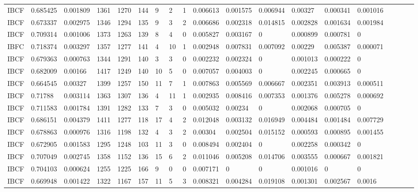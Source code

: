 \begin{table}[H]
{\begin{tabular}{*{19}l}
IBCF 			&	0.685425 &	0.001809 &	1361 &	1270 &	144 &	9 &		2 	&	1 &	0.006613 &	0.001575 &	0.006944 	&	0.00327  &	0.000341 &	0.001016 &	 \\
IBCF 			&	0.673337 &	0.002975 &	1346 &	1294 &	135 &	9 &		3 	&	2 &	0.006686 &	0.002318 &	0.014815 	&	0.002828 &	0.001634 &	0.001984 &	 \\
IBCF 			&	0.709314 &	0.001006 &	1373 &	1263 &	139 &	8 &		4 	&	0 &	0.005827 &	0.003167 &	0 			&	0.000899 &	0.000781 &	0 		 &	 \\
IBFC 			&	0.718374 &	0.003297 &	1357 &	1277 &	141 &	4 &		10	&	1 &	0.002948 &	0.007831 &	0.007092 	&	0.00229  &	0.005387 &	0.000071 &	 \\
IBCF 			&	0.679363 &	0.000763 &	1344 &	1291 &	140 &	3 &		3 	&	0 &	0.002232 &	0.002324 &	0 			&	0.001013 &	0.000222 &	0 		 &	 \\
IBCF			&	0.682009 &	0.00166  &	1417 &	1249 &	140 &	10 &	5 	&	0 &	0.007057 &	0.004003 &	0 		 	&	0.002245 &	0.000665 &	0 &	 \\
IBCF			&	0.664545 &	0.00327  &	1399 &	1257 &	150 &	11 &	7 	&	1 &	0.007863 &	0.005569 &	0.006667 	&	0.002351 &	0.003913 &	0.000511 &	 \\
IBCF			&	0.71788  &	0.003114 &	1363 &	1307 &	136 &	4  &	11	&	1 &	0.002935 &	0.008416 &	0.007353 	&	0.001376 &	0.005278 &	0.000692 &	 \\
IBCF			&	0.711583 &	0.001784 &	1391 &	1282 &	133 &	7  &	3 	&	0 &	0.005032 &	0.00234  &	0 		 	&	0.002068 &	0.000705 &	0 &	 \\
IBCF			&	0.686151 &	0.004379 &	1411 &	1277 &	118 &	17 &	4 	&	2 &	0.012048 &	0.003132 &	0.016949 	&	0.004484 &	0.001484 &	0.007729 &	 \\
IBCF			&	0.678863 &	0.000976 &	1316 &	1198 &	132 &	4  &	3 	&	2 &	0.00304 &	0.002504 &	0.015152 	&	0.000593 &	0.000895 &	0.001455 &	 \\
IBCF			&	0.672905 &	0.001583 &	1295 &	1248 &	103 &	11 &	3 	&	0 &	0.008494 &	0.002404 &	0 		 	&	0.002258 &	0.000342 &	0 		 &	 \\
IBCF			&	0.707049 &	0.002745 &	1358 &	1152 &	136 &	15 &	6 	&	2 &	0.011046 &	0.005208 &	0.014706 	&	0.003555 &	0.000667 &	0.001821 &	 \\
IBCF			&	0.704103 &	0.000624 &	1255 &	1225 &	166 &	9  &	0 	&	0 &	0.007171 &	0 		 &	0 		 	&	0.001016 &	0 		 &	0 		 &	 \\
IBCF			&	0.669948 &	0.001422 &	1322 &	1167 &	157 &	11 &	5 	&	3 &	0.008321 &	0.004284 &	0.019108 	&	0.001301 &	0.002567 &	0.0016   &	 \\


\end{tabular}}
\end{table}
